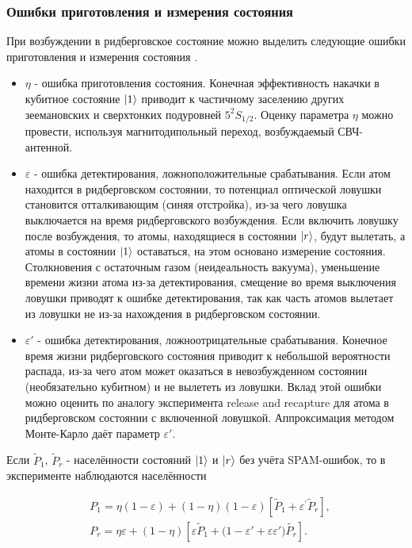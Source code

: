 \subsubsection{Ошибки приготовления и измерения состояния}

При возбуждении в ридберговское состояние можно выделить следующие ошибки приготовления и измерения состояния \cite{Browayes}. 

\begin{itemize}
	\item $\eta$ - 	ошибка приготовления состояния.
	Конечная эффективность накачки в кубитное состояние $\left| 1 \right\rangle$ приводит к частичному заселению других зеемановских и сверхтонких подуровней $5^2S_{1/2}$. Оценку параметра $\eta$ можно провести, используя магнитодипольный переход, возбуждаемый СВЧ-антенной.

	\item $\varepsilon$ - ошибка детектирования, ложноположительные срабатывания. Если атом находится в ридберговском состоянии, то потенциал оптической ловушки становится отталкивающим (синяя отстройка), из-за чего ловушка выключается на время ридберговского возбуждения. Если включить ловушку после возбуждения, то атомы, находящиеся в состоянии $\left| r \right\rangle$, будут вылетать, а атомы в состоянии $\left| 1 \right\rangle$ оставаться, на этом основано измерение состояния. Столкновения с остаточным газом (неидеальность вакуума), уменьшение времени жизни атома из-за детектирования, смещение во время выключения ловушки приводят к ошибке детектирования, так как часть атомов вылетает из ловушки не из-за нахождения в ридберговском состоянии.

	\item $\varepsilon'$ - ошибка детектирования, ложноотрицательные срабатывания. Конечное время жизни ридберговского состояния приводит к небольшой вероятности распада, из-за чего атом может оказаться в невозбужденном состоянии (необязательно кубитном) и не вылететь из ловушки. Вклад этой ошибки можно оценить по аналогу эксперимента release and recapture для атома в ридберговском состоянии с включенной ловушкой. Аппроксимация методом Монте-Карло даёт параметр $\varepsilon'$.
\end{itemize}

Если $\tilde{P}_1$, $\tilde{P}_r$ - населённости состояний $\left| 1 \right\rangle$ и $\left| r \right\rangle$ без учёта SPAM-ошибок, то в эксперименте наблюдаются населённости \cite{Browayes}


\begin{equation}
	\begin{aligned}
		& P_1=\eta\left(1-\varepsilon\right)+\left(1-\eta\right)\left(1-\varepsilon\right)\left[\tilde{P}_1+\varepsilon^\prime\tilde{P}_r\right], \\
		& P_r=\eta\varepsilon+\left(1-\eta\right)\left[\varepsilon\tilde{P}_1+{(1-\varepsilon}'+\varepsilon\varepsilon')\tilde{P_r}\right].
	\end{aligned}
\end{equation}

